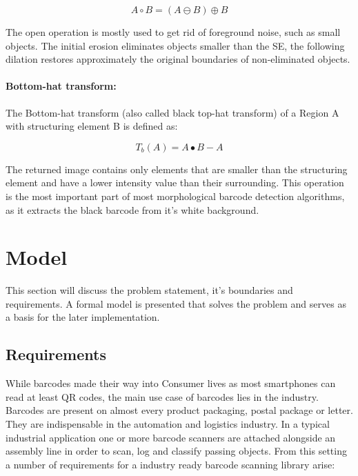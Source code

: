 \documentclass[runningheads,a4paper]{llncs}
\begin{document}
\[ A \circ B = (A \ominus B) \oplus B \]

The open operation is mostly used to get rid of foreground noise, such as small
objects. The initial erosion eliminates objects smaller than the SE, the
following dilation restores approximately the original boundaries of
non-eliminated objects.

\paragraph{Bottom-hat transform:}

The Bottom-hat transform (also called black top-hat transform) of a Region A
with structuring element B is defined as:

\[ T_b(A) = A \bullet B - A \]

The returned image contains only elements that are smaller than the structuring
element and have a lower intensity value than their surrounding. This operation
is the most important part of most morphological barcode detection algorithms,
as it extracts the black barcode from it's white background.

\section{Model}

This section will discuss the problem statement, it's boundaries and
requirements. A formal model is presented that solves the problem and serves as
a basis for the later implementation.

\subsection{Requirements}
\label{sec:requirements}

While barcodes made their way into Consumer lives as most smartphones can read
at least QR codes, the main use case of barcodes lies in the industry. Barcodes are
present on almost every product packaging, postal package or letter. They are
indispensable in the automation and logistics industry.
In a typical industrial application one or more barcode scanners are attached
alongside an assembly line in order to scan, log and classify passing objects.
From this setting a number of requirements for a industry ready barcode scanning
library arise:
\end{document}
